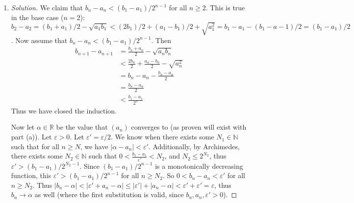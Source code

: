 \documentclass{article}
\newcommand{\N}{{\mathbb N}}
\newcommand{\R}{{\mathbb R}}
\newcommand{\ep}{{\varepsilon}}
\begin{document}
\begin{enumerate}
\begin{proof}[Solution]
		Note then that $(a_n)$ is monotonically increasing,
		and bounded by $a_1$ and $b_1$,
		and $(b_n)$ is monotonically decreasing,
		and bounded by $a_1$ and $b_1$ as well.
		Thus by the Monotone Convergence Theorem,
		and the fact $\R$ is complete,
		we have that $(a_n)$ and $(b_n)$ both converge.
	\end{proof}
	\item \begin{proof}[Solution]\let\qed\relax
		We claim that $b_n - a_n < (b_1 - a_1)/2^{n-1}$
		for all $n \geq 2$.
		This is true in the base case ($n = 2$): $b_2 - a_2 = (b_1 + a_1)/2 - \sqrt{a_1b_1}
		< (2b_1)/2 + (a_1 - b_1)/2 + \sqrt{a_1^2}
		= b_1 - a_1 - (b_1 - a-1)/2 = (b_1 - a_1)/2$.
		Now assume that $b_n - a_n < (b_1 - a_1)/2^{n-1}$.
		Then
		\begin{align*}
			b_{n+1} - a_{n+1}
			&= \frac{b_n+a_n}{2} - \sqrt{a_nb_n}\\
			&< \frac{2b_n}{2} + \frac{a_n - b_n}{2} - \sqrt{a_n^2}\\
			&= b_n - a_n - \frac{b_n - a_n}{2}\\
			&= \frac{b_n - a_n}{2}\\
			&< \frac{b_1 - a_1}{2^n}
		\end{align*}
		Thus we have closed the induction.

		Now let $\alpha \in \R$ be the value that $(a_n)$ converges to
		(as proven will exist with part (a)).
		Let $\ep > 0$.
		Let $\ep' = \ep/2$.
		We know when there exists some $N_1 \in \N$ such that for all $n \geq N$,
		we have $|\alpha - a_n| < \ep'$.
		Additionally, by Archimedes, there exists some $N_2 \in \N$ such that
		$0 < \frac{b_1-a_1}{\ep'} < N_2$,
		and $N_2 \leq 2^{N_2}$,
		thus $\ep' > (b_1 - a_1)/2^{N_2-1}$.
		Since $(b_1 - a_1)/2^{n-1}$ is a monotonically decreasing function,
		this $\ep' > (b_1 - a_1)/2^{n-1}$ for all $n \geq N_2$.
		So $0 < b_n - a_n < \ep'$ for all $n \geq N_2$.
		Thus $|b_n - \alpha| < |\ep' + a_n - \alpha| \leq |\ep'| + |a_n - \alpha|
		< \ep' + \ep' = \ep$,
		thus $b_n \to \alpha$ as well
		(where the first substitution is valid, since $b_n, a_n, \ep' > 0$).
	\end{proof}
\end{enumerate}
\clearpage
~\clearpage
\end{document}
